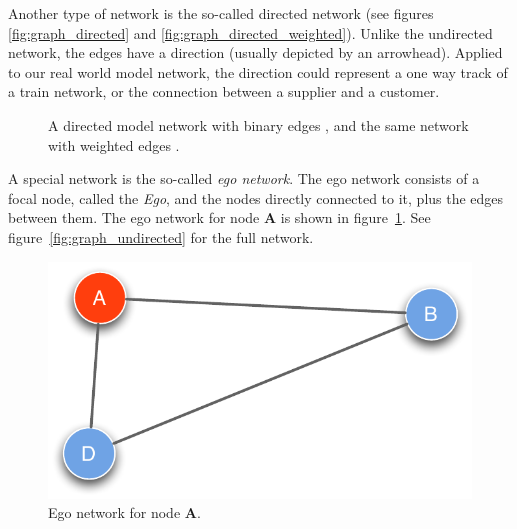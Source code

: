 Another type of network is the so-called directed network (see figures \ref{fig:graph_directed} and \ref{fig:graph_directed_weighted}). Unlike the undirected network, the edges have a direction (usually depicted by an arrowhead). Applied to our real world model network, the direction could represent a one way track of a train network, or the connection between a supplier and a customer.  

\begin{figure}[htpb]%
	\centering 
	\qquad 
	\caption[Directed model network with binary and weighted edges]{A directed model network with binary edges , and the same network with weighted edges .} 

\end{figure}

A special network is the so-called \textit{ego network}. The ego network consists of a focal node, called the \textit{Ego}, and the nodes directly connected to it, plus the edges between them. The ego network for node \textbf{A} is shown in figure~\ref{fig:graph_ego}. See figure~\ref{fig:graph_undirected} for the full network.

\begin{figure}[htbp]
\begin{center}
  \includegraphics[width=.45\textwidth]{assets/pdf/graph_egocentric.pdf}
  \caption[Ego network]{Ego network for node \textbf{A}.}
  \label{fig:graph_ego}
\end{center}
\end{figure}  

